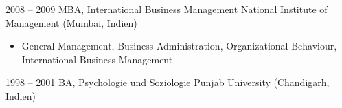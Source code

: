 \documentclass[a4paper,]{fortysecondscv}
\begin{document}
		\begin{cvtable}[2]
			\cvitem
				{2008 -- 2009}
				{MBA, International Business Management}
				{National Institute of Management (Mumbai, Indien)}
				{	
					\begin{itemize}[nosep, leftmargin=0pt, label={}] %
						\item General Management, Business Administration, Organizational Behaviour, International Business Management 
					\end{itemize}
				}
			\cvitem
				{1998 -- 2001}
				{BA, Psychologie und Soziologie}
				{Punjab University (Chandigarh, Indien)}
				{
				}
		\end{cvtable}
\end{document}
